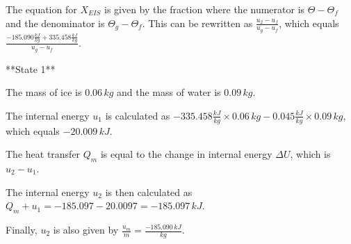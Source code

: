 The equation for \( X_{EIS} \) is given by the fraction where the numerator is \( \Theta - \Theta_f \) and the denominator is \( \Theta_g - \Theta_f \). This can be rewritten as \( \frac{u_2 - u_f}{u_g - u_f} \), which equals \( \frac{-185.090 \frac{kJ}{kg} + 335.458 \frac{kJ}{kg}}{u_g - u_f} \).

**State 1**

The mass of ice is \( 0.06 \, kg \) and the mass of water is \( 0.09 \, kg \).

The internal energy \( u_1 \) is calculated as \( -335.458 \frac{kJ}{kg} \times 0.06 \, kg - 0.045 \frac{kJ}{kg} \times 0.09 \, kg \), which equals \( -20.009 \, kJ \).

The heat transfer \( Q_m \) is equal to the change in internal energy \( \Delta U \), which is \( u_2 - u_1 \).

The internal energy \( u_2 \) is then calculated as \( Q_m + u_1 = -185.097 - 20.0097 = -185.097 \, kJ \).

Finally, \( u_2 \) is also given by \( \frac{u_m}{m} = \frac{-185.090 \, kJ}{kg} \).